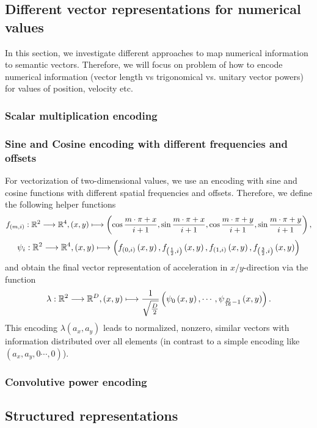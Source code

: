 \subsection{Different vector representations for numerical values}%
\label{subsec:different_vector_representations_for_numerical_values}


In this section, we investigate different approaches to map numerical information to semantic vectors.
Therefore, we will focus on
problem of how to encode numerical information (vector length vs trigonomical vs. unitary vector powers) for values of position, velocity etc.
\subsubsection{Scalar multiplication encoding}
\subsubsection{Sine and Cosine encoding with different frequencies and offsets}
For vectorization of two-dimensional values, we use an encoding with sine and cosine functions with different spatial frequencies and offsets.
Therefore, we define the following helper functions
\[ f_{\left(m,i\right)}: \mathbb{R}^2 \longrightarrow \mathbb{R}^4, \left(x,y\right) \longmapsto \left(\cos\frac{m\cdot \pi + x}{i + 1}, \sin\frac{m\cdot \pi + x}{i + 1}, \cos\frac{m\cdot \pi + y}{i + 1}, \sin\frac{m\cdot \pi + y}{i + 1}\right),
\]
\[
\psi_i: \mathbb{R}^2 \longrightarrow \mathbb{R}^4, \left(x,y\right) \longmapsto \left(f_{\left(0,i\right)}\left(x,y\right), f_{\left(\frac{1}{2},i\right)}\left(x,y\right), f_{\left(1,i\right)}\left(x,y\right), f_{\left(\frac{3}{2},i\right)}\left(x,y\right)\right)
\]
and obtain the final vector representation of acceleration in $x$/$y$-direction via the function
\[
\lambda: \mathbb{R}^2 \longrightarrow \mathbb{R}^D, \left(x,y\right) \longmapsto \frac{1}{\sqrt{\frac{D}{2}}}\left(\psi_0\left(x,y\right), \cdots, \psi_{\frac{D}{16}-1}\left(x,y\right)\right).
\]
This encoding $\lambda\left(a_x, a_y\right)$ leads to normalized, nonzero, similar vectors with information distributed over all elements (in contrast to a simple encoding like $\left(a_x, a_y, 0 \cdots, 0\right)$).
\subsubsection{Convolutive power encoding}

\subsection{Structured representations}%
\label{subsec:structured_representations}

